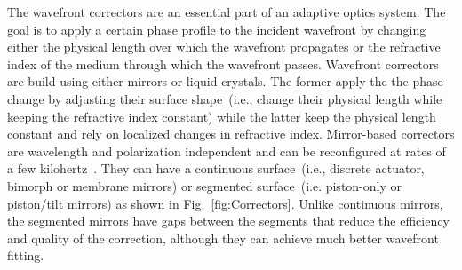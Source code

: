 The wavefront correctors are an essential part of an adaptive optics system. The goal is to apply a certain phase profile to the incident wavefront by changing either the physical length over which the wavefront propagates or the refractive index of the medium through which the wavefront passes. Wavefront correctors are build using either mirrors or liquid crystals. The former apply the the phase change by adjusting their surface shape~(i.e., change their physical length while keeping the refractive index constant) while the latter keep the physical length constant and rely on localized changes in refractive index.  Mirror-based correctors are wavelength and polarization independent and can be reconfigured at rates of a few kilohertz~\cite{AOM_basic_ref}. They can have a continuous surface~(i.e., discrete actuator, bimorph or membrane mirrors) or segmented surface~(i.e. piston-only or piston/tilt mirrors) as shown in Fig.~\ref{fig:Correctors}. Unlike continuous mirrors, the segmented mirrors have gaps between the segments that reduce the efficiency and quality of the correction, although they can achieve much better wavefront fitting. 

